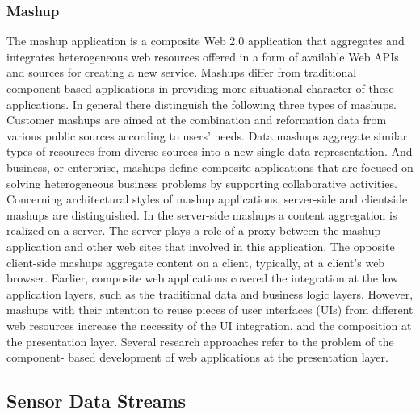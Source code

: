 \subsubsection {Mashup}
The mashup application is a composite Web 2.0 application that aggregates and
integrates heterogeneous web resources offered in a form of available Web APIs and
sources for creating a new service. Mashups differ from traditional component-based
applications in providing more situational character of these applications\cite{yu2008understanding}.
In general there distinguish the following three types of mashups\cite{peenikal2009mashups}. 
Customer mashups are aimed at the combination and reformation data from various
public sources according to users’ needs. Data mashups aggregate similar types of
resources from diverse sources into a new single data representation. And business,
or enterprise, mashups define composite applications that are focused on solving
heterogeneous business problems by supporting collaborative activities\cite{hoyer2008enterprise}.
Concerning architectural styles of mashup applications,
 server-side and clientside mashups are distinguished. In the server-side mashups a content aggregation
is realized on a server. The server plays a role of a proxy between the
mashup application and other web sites that involved in this application. The
opposite client-side mashups aggregate content on a client, typically, at a client’s
web browser\cite{ort2007mashup}.
Earlier, composite web applications covered the integration at the low application
layers, such as the traditional data and business logic layers. However, mashups with
their intention to reuse pieces of user interfaces (UIs) from different web resources
increase the necessity of the UI integration, and the composition at the presentation
layer\cite{daniel2007understanding}. Several research approaches refer to the problem of the component-
based development of web applications at the presentation layer\cite{pietschmann2010application}.
\subsection {Sensor Data Streams}

